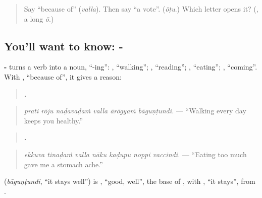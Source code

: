 \label{lesson:TE-C319-nadavadam-valla}



\begin{quote}
Say \textquotedblleft{}because of\textquotedblright{} (\emph{valla}). Then say \textquotedblleft{}a vote\textquotedblright{}. (\emph{ōṭu}.) Which letter opens it? (\textbf{}, a long \emph{ō}.)
\end{quote}

\subsection*{You'll want to know: - }
\textbf{-} turns a verb into a noun, \textquotedblleft{}-ing\textquotedblright{}: \textbf{}, \textquotedblleft{}walking\textquotedblright{}; \textbf{}, \textquotedblleft{}reading\textquotedblright{}; \textbf{}, \textquotedblleft{}eating\textquotedblright{}; \textbf{}, \textquotedblleft{}coming\textquotedblright{}. With \textbf{}, \textquotedblleft{}because of\textquotedblright{}, it gives a reason:

\begin{quote}
\textbf{     .}
\end{quote}

\begin{quote}
\emph{prati rōju naḍavaḍaṁ valla ārōgyaṁ bāguṇṭundi.} — \textquotedblleft{}Walking every day keeps you healthy.\textquotedblright{}
\end{quote}

\begin{quote}
\textbf{      .}
\end{quote}

\begin{quote}
\emph{ekkuva tinaḍaṁ valla nāku kaḍupu noppi vaccindi.} — \textquotedblleft{}Eating too much gave me a stomach ache.\textquotedblright{}
\end{quote}

\textbf{} (\emph{bāguṇṭundi}, \textquotedblleft{}it stays well\textquotedblright{}) is \textbf{}, \textquotedblleft{}good, well\textquotedblright{}, the base of \textbf{}, with \textbf{}, \textquotedblleft{}it stays\textquotedblright{}, from \textbf{}.

